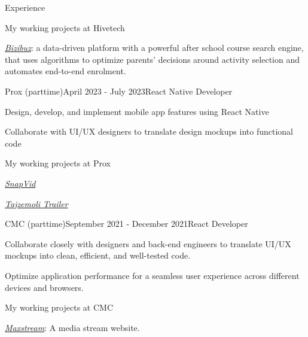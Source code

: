 \documentclass{resume}
\begin{document}
\begin{rSection}{Experience}
    \vspace{-0.5cm}\begin{rSubsection}{}{}{My working projects at Hivetech}{}
      \item \href{https://bizibuz.com/}{\emph{Bizibuz}}: a data-driven platform with a powerful after school course search engine, that uses algorithms to optimize parents’ decisions around activity selection and automates end-to-end enrolment.
    \end{rSubsection}

    \vspace{0.8cm}\begin{rSubsection}{Prox (parttime)}{April 2023 - July 2023}{React Native Developer}{}
      \item Design, develop, and implement mobile app features using React Native
      \item Collaborate with UI/UX designers to translate design mockups into functional code
    \end{rSubsection}

    \vspace{-0.5cm}\begin{rSubsection}{}{}{My working projects at Prox}{}
      \item \href{https://apps.apple.com/us/app/pure-tubi-mp3-player/id1658133343}{\emph{SnapVid}}
      \item \href{https://apps.apple.com/vn/app/id1617873009}{\emph{Tajzemoli Trailer}}
    \end{rSubsection}

    \vspace{0.8cm}\begin{rSubsection}{CMC (parttime)}{September 2021 - December 2021}{React Developer}{}
      \item Collaborate closely with designers and back-end engineers to translate UI/UX mockups into clean, efficient, and well-tested code.
      \item Optimize application performance for a seamless user experience across different devices and browsers.
    \end{rSubsection}

    \vspace{-0.5cm}\begin{rSubsection}{}{}{My working projects at CMC}{}
      \item \href{https://maxstream.tv/}{\emph{Maxstream}}: A media stream website.
    \end{rSubsection}



\end{rSection}
\end{document}
